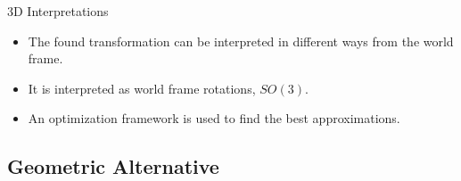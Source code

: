 \begin{frame}[t]{3D Interpretations}

  \begin{itemize}
    \item The found transformation can be interpreted in different ways from the world frame.
    \item It is interpreted as world frame rotations, $SO(3)$.
    \item An optimization framework is used to find the best approximations.
  \end{itemize}



\end{frame}

\subsection{Geometric Alternative}
\label{sub:geometric_alternative}

